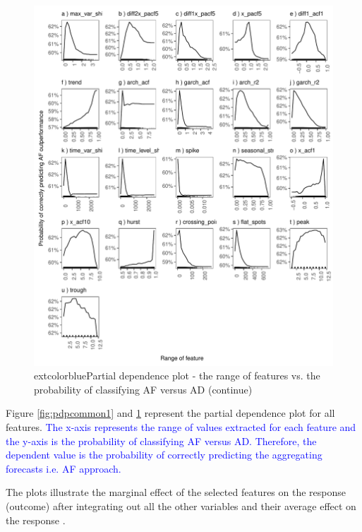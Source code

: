 \documentclass[preprint, 3p,
authoryear]{elsarticle} %
\begin{document}
\begin{figure}[H]

{\centering \includegraphics[width=1\linewidth]{img/300dpi/partial_dependence2} 

}

\caption{   extcolor{blue}{Partial dependence plot - the range of features vs. the probability of classifying AF versus AD (continue)} }\label{fig:pdpcommon2}
\end{figure}

Figure \ref{fig:pdpcommon1} and \ref{fig:pdpcommon2} represent the
partial dependence plot for all features.
\textcolor{blue}{The x-axis represents the range of values extracted for each feature and the y-axis is the probability of classifying AF versus AD. Therefore, the dependent value is the probability of correctly predicting the aggregating forecasts i.e. AF approach.}

The plots illustrate the marginal effect of the selected features on the
response (outcome) after integrating out all the other variables and
their average effect on the response \citep{james2013introduction}.
\end{document}
